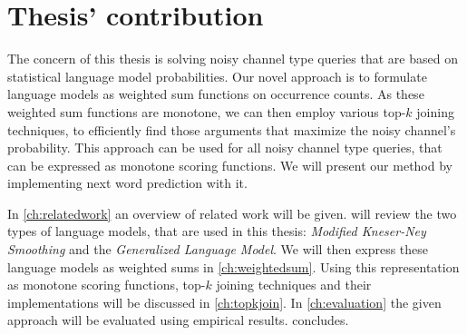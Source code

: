 \section{Thesis' contribution}

The concern of this thesis is solving noisy channel type queries that are based
on statistical language model probabilities.
Our novel approach is to formulate language models as weighted sum functions on
occurrence counts.
As these weighted sum functions are monotone, we can then employ various
top-$k$ joining techniques, to efficiently find those arguments that maximize
the noisy channel's probability.
This approach can be used for all noisy channel type queries, that can be
expressed as monotone scoring functions.
We will present our method by implementing next word prediction with it.

In \cref{ch:relatedwork} an overview of related work will be given.
 will review the two types of language models, that are used in
this thesis: \emph{Modified Kneser-Ney Smoothing} and the \emph{Generalized
Language Model}.
We will then express these language models as weighted sums in
\cref{ch:weightedsum}.
Using this representation as monotone scoring functions, top-$k$ joining
techniques and their implementations will be discussed in \cref{ch:topkjoin}.
In \cref{ch:evaluation} the given approach will be evaluated using empirical
results.
 concludes.
